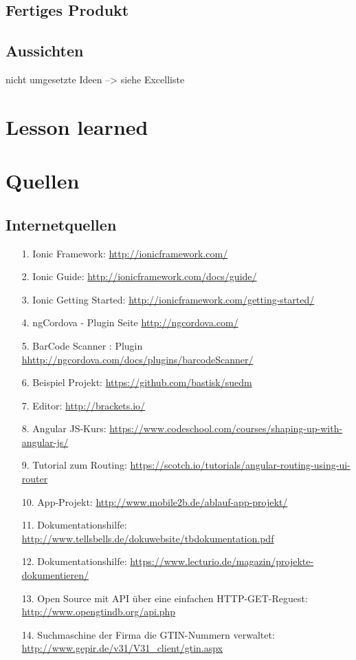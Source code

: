\documentclass[12pt,a4paper]{article}
\begin{document}
\subsection{Fertiges Produkt}
\subsection{Aussichten}
nicht umgesetzte Ideen --> siehe Excelliste
\newpage
\section{Lesson learned}
\newpage
\section*{Quellen}
\subsection*{Internetquellen}
\begin{itemize}
\item[1.]Ionic Framework: \url{http://ionicframework.com/}
\item[2.]Ionic Guide: \url{http://ionicframework.com/docs/guide/}
\item[3.]Ionic Getting Started: \url{http://ionicframework.com/getting-started/}
\item[4.]ngCordova - Plugin Seite \url{http://ngcordova.com/}
\item[5.]BarCode Scanner : Plugin \url{hhttp://ngcordova.com/docs/plugins/barcodeScanner/}
\item[6.]Beispiel Projekt: \url{https://github.com/bastisk/suedm}
\item[7.]Editor: \url{http://brackets.io/}
\item[8.]Angular JS-Kurs: \url{https://www.codeschool.com/courses/shaping-up-with-angular-js/}
\item[9.]Tutorial zum Routing: \url{https://scotch.io/tutorials/angular-routing-using-ui-router}
\item[10.]App-Projekt: \url{http://www.mobile2b.de/ablauf-app-projekt/}
\item[11.] Dokumentationshilfe: \url{http://www.tellsbells.de/dokuwebsite/tbdokumentation.pdf}
\item[12.] Dokumentationshilfe: \url{https://www.lecturio.de/magazin/projekte-dokumentieren/}
\item[13.] Open Source mit API über eine einfachen HTTP-GET-Reguest: \url{http://www.opengtindb.org/api.php}
\item[14.] Suchmaschine der Firma die GTIN-Nummern verwaltet: \url{http://www.gepir.de/v31/V31_client/gtin.aspx}
\end{itemize}
\newpage
\end{document}
